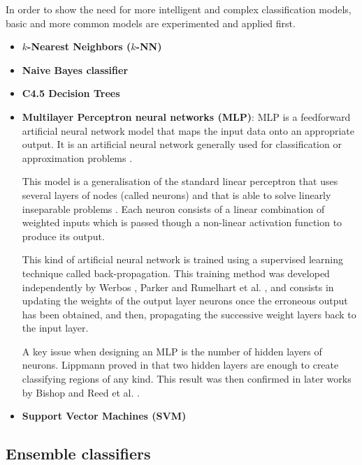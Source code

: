 \documentclass{llncs}
\begin{document}
In order to show the need for more intelligent and complex classification models, basic and more common models are experimented and applied first. 
\begin{itemize}

\item \textbf{$k$-Nearest Neighbors ($k$-NN)}

\item \textbf{Naive Bayes classifier}

\item \textbf{C4.5 Decision Trees}


\item \textbf{Multilayer Perceptron neural networks (MLP)}: MLP is a feedforward 
artificial neural network model that maps the input data onto an appropriate output. 
It is an artificial neural network generally used for classification or 
approximation problems \cite{Rosenblatt1962,Widrow1990} .

This model is a generalisation of the standard linear perceptron that uses several 
layers of nodes (called neurons) and that is able to solve linearly inseparable 
problems \cite{SteinwenderBitzer2003}.
Each neuron consists of a linear combination of weighted inputs which is passed 
though a non-linear activation function to produce its output.

This kind of artificial neural network is trained using a supervised learning 
technique called back-propagation.
This training method was developed independently by Werbos \cite{Werbos1974}, 
Parker \cite{Parker1985} and Rumelhart et al. \cite{Rumelhart1985}, and consists
in updating the weights of the output layer neurons once the erroneous output 
has been obtained, and then, propagating the successive weight layers back to 
the input layer.

A key issue when designing an MLP is the number of hidden layers of neurons.
Lippmann proved in \cite{Lippmann1987} that two hidden layers are enough to 
create classifying regions of any kind. This result was then confirmed in later 
works by Bishop \cite{Bishop1996} and Reed et al. \cite{Reed1999}.

\item \textbf{Support Vector Machines (SVM)}


\end{itemize}






\subsection{Ensemble classifiers}
\end{document}
